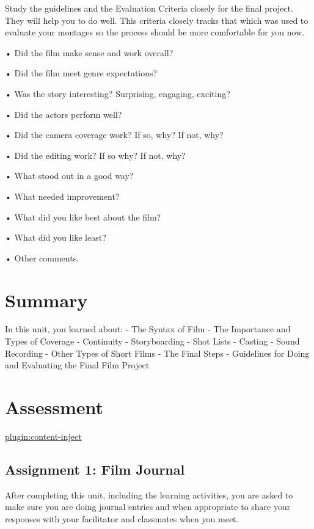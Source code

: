 \documentclass[
]{book}
\begin{document}
Study the guidelines and the Evaluation Criteria closely for the final project. They will help you to do well. This criteria closely tracks that which was used to evaluate your montages so the process should be more comfortable for you now.

• Did the film make sense and work overall?

• Did the film meet genre expectations?

• Was the story interesting? Surprising, engaging, exciting?

• Did the actors perform well?

• Did the camera coverage work? If so, why? If not, why?

• Did the editing work? If so why? If not, why?

• What stood out in a good way?

• What needed improvement?

• What did you like best about the film?

• What did you like least?

• Other comments.

\hypertarget{summary-8}{%
\section*{Summary}\label{summary-8}}

In this unit, you learned about:
- The Syntax of Film
- The Importance and Types of Coverage
- Continuity
- Storyboarding
- Shot Lists
- Casting
- Sound Recording
- Other Types of Short Films
- The Final Steps
- Guidelines for Doing and Evaluating the Final Film Project

\hypertarget{assessment-9}{%
\section*{Assessment}\label{assessment-9}}

\href{../../assignments/_film-journal}{plugin:content-inject}

\hypertarget{assignment-1-film-journal-2}{%
\subsection*{Assignment 1: Film Journal}\label{assignment-1-film-journal-2}}

After completing this unit, including the learning activities, you are asked to make sure you are doing journal entries and when appropriate to share your responses with your facilitator and classmates when you meet.
\end{document}
